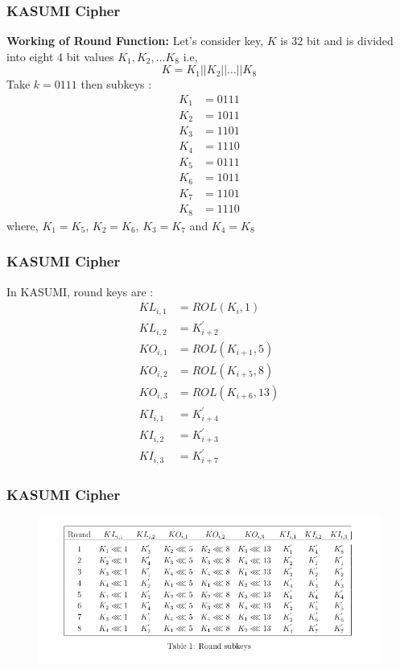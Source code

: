 \documentclass{beamer}
\begin{document}
\begin{frame}
	\frametitle{KASUMI Cipher}
	\textbf{Working of Round Function:}
	Let's consider key, $K$ is $32$ bit and is divided into eight $4$ bit values $K_1, K_2, \dots K_8$ i.e,
	$$ K = K_1 || K_2 || \dots || K_8$$
	Take $k = 0111$ then subkeys :
	\begin{align*}
		K_1 &= 0111\\
		K_2 &= 1011 \\
		K_3 &= 1101\\
		K_4 &= 1110\\
		K_5 &= 0111\\
		K_6 &= 1011\\
		K_7 &= 1101 \\
		K_8 &= 1110
	\end{align*}
	where, $K_1 = K_5$, $K_2 = K_6$, $K_3 = K_7$ and $K_4 = K_8$ \\

\end{frame}
\begin{frame}[t]
	\frametitle{KASUMI Cipher}
	In KASUMI, round keys are :
	\begin{align*}
		KL_{i,1} &= ROL(K_i,1) \\
		KL_{i,2} &= K^{'}_{i+2} \\
		KO_{i,1} &= ROL(K_{i+1},5) \\
		KO_{i,2} &= ROL(K_{i+5},8) \\
		KO_{i,3} &= ROL(K_{i+6},13) \\
		KI_{i,1} &= K^{'}_{i+4} \\
		KI_{i,2} &= K^{'}_{i+3} \\
	    KI_{i,3} &= K^{'}_{i+7} 
	\end{align*}
\end{frame}

\begin{frame}
	\frametitle{KASUMI Cipher}
	\begin{figure}[h]
		\includegraphics[width=12cm]{rk}
	\end{figure}
\end{frame}
\end{document}

